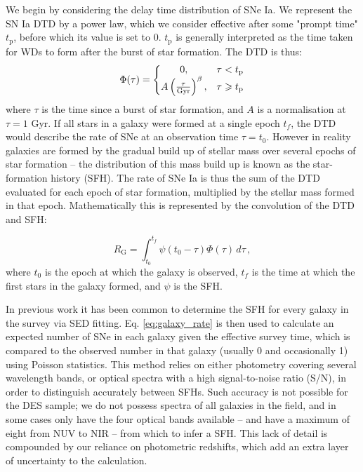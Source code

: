 \documentclass[fleqn,usenatbib]{mnras}
\begin{document}
We begin by considering the delay time distribution of SNe Ia.
We represent the SN Ia DTD by a power law, which we consider effective after some "prompt time" $t_{\mathrm{p}}$, before which its value is set to 0. $t_{\mathrm{p}}$ is generally interpreted as the time taken for WDs to form after the burst of star formation. The DTD is thus:
\begin{equation}
 \Phi(\tau) = \left\{
    \begin{array}{@{}cc@{}}
    0 , & \tau < t_{\mathrm{p}} \\
    A\left(\frac{\tau}{\mathrm{Gyr}}\right)^{\beta} , & \tau \geq t_{\mathrm{p}}
    \end{array}\right.
        \label{eq:dtd}
\end{equation} 
where $\tau$ is the time since a burst of star formation, and $A$ is a normalisation at $\tau=1$ Gyr. If all stars in a galaxy were formed at a single epoch $t_f$, the DTD would describe the rate of SNe at an observation time $\tau = t_0$. However in reality galaxies are formed by the gradual build up of stellar mass over several epochs of star formation -- the distribution of this mass build up is known as the star-formation history (SFH). The rate of SNe Ia is thus the sum of the DTD evaluated for each epoch of star formation, multiplied by the stellar mass formed in that epoch. Mathematically this is represented by the convolution of the DTD and SFH:

\begin{equation}
    R_{\mathrm{G}} = \int_{t_0}^{t_f} \psi(t_0-\tau)\Phi(\tau)\,d\tau \,,
    \label{eq:galaxy_rate}
\end{equation}
where $t_0$ is the epoch at which the galaxy is observed, $t_f$ is the time at which the first stars in the galaxy formed, and $\psi$ is the SFH. 

In previous work \citep[e.g.][]{Strolger2004,Maoz2012} it has been common to determine the SFH for every galaxy in the survey via SED fitting. Eq. \ref{eq:galaxy_rate} is then used to calculate an expected number of SNe in each galaxy given the effective survey time, which is compared to the observed number in that galaxy (usually 0 and occasionally 1) using Poisson statistics. This method relies on either photometry covering several wavelength bands, or optical spectra with a high signal-to-noise ratio (S/N), in order to distinguish accurately between SFHs. Such accuracy is not possible for the DES sample; we do not possess spectra of all galaxies in the field, and in some cases only have the four optical bands available -- and have a maximum of eight from NUV to NIR -- from which to infer a SFH. This lack of detail is compounded by our reliance on photometric redshifts, which add an extra layer of uncertainty to the calculation. 
\end{document}
